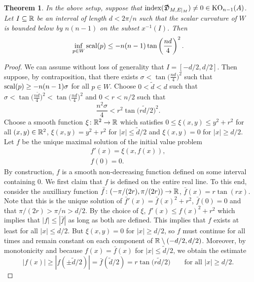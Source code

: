 \documentclass[11pt]{article}
\numberwithin{equation}{section}
\newtheorem{Theorem}{Theorem}[section]
\begin{document}
\begin{Theorem}\label{thm:quantitative-codim-1}
 In the above setup, suppose that \(\operatorname{index}(\slashed{\mathfrak{D}}_{M, E|_M}) \neq 0 \in \operatorname{KO}_{n-1}(A)\).
 Let \(I \subseteq \mathbb{R}\) be an interval of length \(d < 2 \pi / n\) such that the scalar curvature of \(W\) is bounded below by \(n(n-1)\) on the subset \(x^{-1}(I)\).
 Then
 \begin{equation*}
 \inf_{p \in W} \operatorname{scal}(p) \leq - n(n-1) \tan\left(\frac{nd}{4}\right)^2.
 \end{equation*}
 \end{Theorem}
 \begin{proof}
 We can assume without loss of generality that \(I = [-d/2,d/2]\).
 Then suppose, by contraposition, that there exists \(\sigma < \tan\big(\frac{nd}{4}\big)^2\) such that \(\operatorname{scal}(p) \geq -n(n-1) \sigma\) for all \(p \in W\).
 Choose \(0 < \tilde{d} < d\) such that \(\sigma < \tan\big(\frac{n\tilde{d}}{4}\big)^2 < \tan\big(\frac{nd}{4}\big)^2\) and \(0 < r < n/2\) such that
 \begin{equation}
 \frac{n^2 \sigma}{4} < r^2 \tan\big(r\tilde{d}/2\big)^2. \label{eq:choose-r}
 \end{equation}
 Choose a smooth function \(\xi \colon \mathbb{R}^2 \to \mathbb{R}\) which satisfies \(0 \leq \xi(x,y) \leq y^2 + r^2\) for all \((x,y) \in \mathbb{R}^2\), \(\xi(x,y) = y^2 + r^2\) for \(|x| \leq \tilde{d}/2\) and \(\xi(x,y) = 0\) for \(|x| \geq d/2\).
 Let \(f\) be the unique maximal solution of the initial value problem
 \begin{gather*}
 f'(x) = \xi(x,f(x)), \\
 f(0) = 0.
 \end{gather*}
 By construction, \(f\) is a smooth non-decreasing function defined on some interval containing \(0\).
 We first claim that \(f\) is defined on the entire real line.
 To this end, consider the auxilliary function \(\bar{f} \colon (-\pi/(2 r), \pi/(2r)) \to \mathbb{R}\), \(\bar{f}(x) = r \tan(r x)\).
 Note that this is the unique solution of \(\bar{f}'(x)= \bar{f}(x)^2 + r^2\), \(\bar{f}(0) = 0\) and that \(\pi/(2r) > \pi /n > d/2\).
 By the choice of \(\xi\), \(f'(x) \leq f(x)^2 + r^2\) which implies that \(|f| \leq |\bar{f}|\) as long as both are defined.
 This implies that \(f\) exists at least for all \(|x| \leq d/2\).
 But \(\xi(x,y) = 0\) for \(|x| \geq d/2\), so \(f\) must continue for all times and remain constant on each component of \(\mathbb{R} \setminus (-d/2,d/2)\).
 Moreover, by monotonicity and because \(f(x) = \bar{f}(x)\) for \(|x| \leq \tilde{d}/2\), we obtain the estimate
 \begin{equation}
 |f(x)| \geq |f(\pm \tilde{d}/2)| = \bar{f}(\tilde{d}/2) = r \tan\big(r \tilde{d} / 2\big) \qquad \text{for all \(|x| \geq d/2\).}
 \label{eq:outside-bound}
 \end{equation}


\end{proof}
\end{document}
